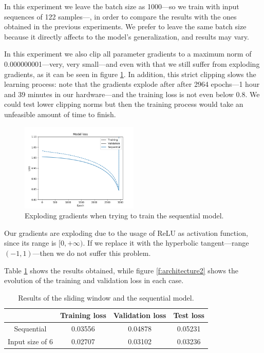 \documentclass[]{article}
\begin{document}
In this experiment we leave the batch size as 1000---so we train with input sequences of 122 samples---, in order to compare the results with the ones obtained in the previous experiments. We prefer to leave the same batch size because it directly affects to the model’s generalization, and results may vary.

In this experiment we also clip all parameter gradients to a maximum norm of 0.000000001---very, very small---and even with that we still suffer from exploding gradients, as it can be seen in figure \ref{f:architecture1}. In addition, this strict clipping slows the learning process: note that the gradients explode after after 2964 epochs---1 hour and 39 minutes in our hardware---and the training loss is not even below 0.8. We could test lower clipping norms but then the training process would take an unfeasible amount of time to finish.

\begin{figure}[H]
	\centering
	\includegraphics[width=0.5\textwidth]{architecture1}
	\caption{Exploding gradients when trying to train the sequential model.}
	\label{f:architecture1}
\end{figure}

Our gradients are exploding due to the usage of ReLU as activation function, since its range is $ [0, +\infty) $. If we replace it with the hyperbolic tangent---range $ (-1, 1) $---then we do not suffer this problem.

Table \ref{t:architecture2} shows the results obtained, while figure \ref{f:architecture2} shows the evolution of the training and validation loss in each case.

\begin{table}[H]
	\centering
	\begin{tabular}{@{}cccc@{}}
		\toprule
		& Training loss & Validation loss & Test loss \\ \midrule
		Sequential      & 0.03556       & 0.04878         & 0.05231   \\
		Input size of 6 & 0.02707       & 0.03102         & 0.03236   \\ \bottomrule
	\end{tabular}
	\caption{Results of the sliding window and the sequential model.}
	\label{t:architecture2}
\end{table}
\end{document}
